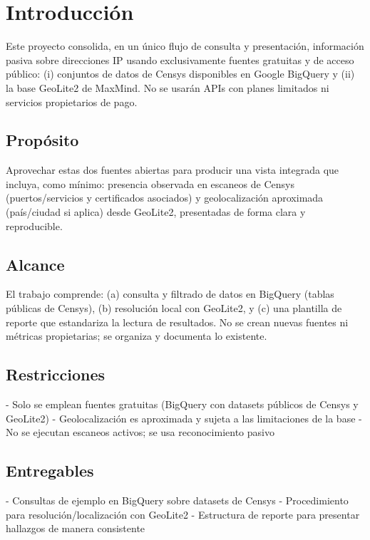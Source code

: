 \section{Introducción}

Este proyecto consolida, en un único flujo de consulta y presentación, información pasiva sobre direcciones IP usando exclusivamente fuentes gratuitas y de acceso público: (i) conjuntos de datos de Censys disponibles en Google BigQuery y (ii) la base GeoLite2 de MaxMind. No se usarán APIs con planes limitados ni servicios propietarios de pago.

\subsection{Propósito}

Aprovechar estas dos fuentes abiertas para producir una vista integrada que incluya, como mínimo: presencia observada en escaneos de Censys (puertos/servicios y certificados asociados) y geolocalización aproximada (país/ciudad si aplica) desde GeoLite2, presentadas de forma clara y reproducible.

\subsection{Alcance}

El trabajo comprende: (a) consulta y filtrado de datos en BigQuery (tablas públicas de Censys), (b) resolución local con GeoLite2, y (c) una plantilla de reporte que estandariza la lectura de resultados. No se crean nuevas fuentes ni métricas propietarias; se organiza y documenta lo existente.

\subsection{Restricciones}

- Solo se emplean fuentes gratuitas (BigQuery con datasets públicos de Censys y GeoLite2)
- Geolocalización es aproximada y sujeta a las limitaciones de la base
- No se ejecutan escaneos activos; se usa reconocimiento pasivo

\subsection{Entregables}

- Consultas de ejemplo en BigQuery sobre datasets de Censys
- Procedimiento para resolución/localización con GeoLite2
- Estructura de reporte para presentar hallazgos de manera consistente
